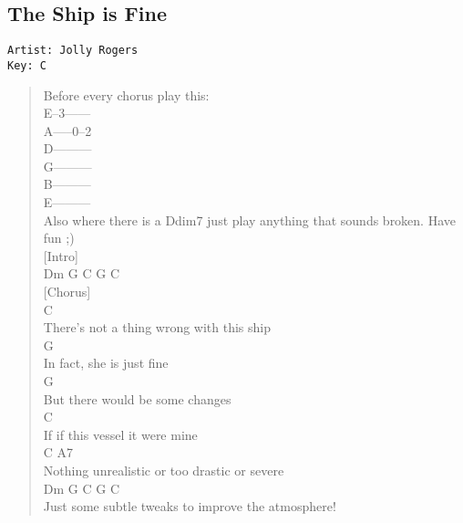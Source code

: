 \documentclass[11pt]{article}
\begin{document}
\subsection{The Ship is Fine}
\label{sec:orgb8183d6}
\begin{verbatim}
Artist: Jolly Rogers
Key: C
\end{verbatim}
\begin{verse}
Before every chorus play this:\\
E--3------\\
A-----0--2\\
D---------\\
G---------\\
B---------\\
E---------\\
Also where there is a Ddim7 just play anything that sounds broken. Have fun ;)\\
\vspace*{1em}
\vspace*{1em}
\vspace*{1em}
[Intro]\\
\vspace*{1em}
Dm G C G C\\
\vspace*{1em}
\vspace*{1em}
[Chorus]\\
\vspace*{1em}
\hspace*{1em}C\\
There's not a thing wrong with this ship\\
\hspace*{1em}G\\
In fact, she is just fine\\
\hspace*{1em}G\\
But there would be some changes\\
\hspace*{1em}C\\
If if this vessel it were mine\\
\hspace*{1em}C                           A7\\
Nothing unrealistic or too drastic or severe\\
\hspace*{1em}Dm                G             C         G       C\\
Just some subtle tweaks to improve the atmosphere!\\
\vspace*{1em}

\end{verse}
\end{document}
